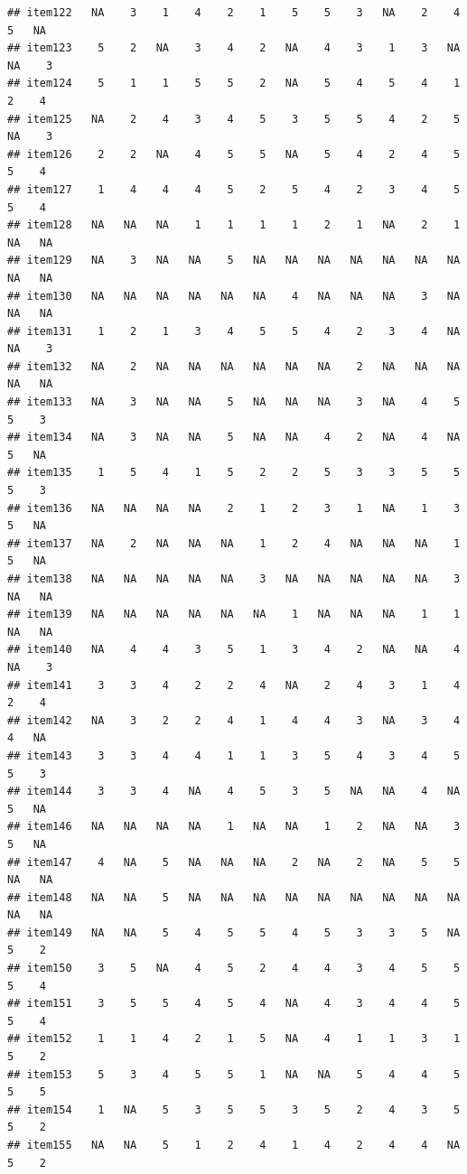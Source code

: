 \documentclass[
  man]{apa6}
\begin{document}
\begin{verbatim}
## item122   NA    3    1    4    2    1    5    5    3   NA    2    4    5   NA
## item123    5    2   NA    3    4    2   NA    4    3    1    3   NA   NA    3
## item124    5    1    1    5    5    2   NA    5    4    5    4    1    2    4
## item125   NA    2    4    3    4    5    3    5    5    4    2    5   NA    3
## item126    2    2   NA    4    5    5   NA    5    4    2    4    5    5    4
## item127    1    4    4    4    5    2    5    4    2    3    4    5    5    4
## item128   NA   NA   NA    1    1    1    1    2    1   NA    2    1   NA   NA
## item129   NA    3   NA   NA    5   NA   NA   NA   NA   NA   NA   NA   NA   NA
## item130   NA   NA   NA   NA   NA   NA    4   NA   NA   NA    3   NA   NA   NA
## item131    1    2    1    3    4    5    5    4    2    3    4   NA   NA    3
## item132   NA    2   NA   NA   NA   NA   NA   NA    2   NA   NA   NA   NA   NA
## item133   NA    3   NA   NA    5   NA   NA   NA    3   NA    4    5    5    3
## item134   NA    3   NA   NA    5   NA   NA    4    2   NA    4   NA    5   NA
## item135    1    5    4    1    5    2    2    5    3    3    5    5    5    3
## item136   NA   NA   NA   NA    2    1    2    3    1   NA    1    3    5   NA
## item137   NA    2   NA   NA   NA    1    2    4   NA   NA   NA    1    5   NA
## item138   NA   NA   NA   NA   NA    3   NA   NA   NA   NA   NA    3   NA   NA
## item139   NA   NA   NA   NA   NA   NA    1   NA   NA   NA    1    1   NA   NA
## item140   NA    4    4    3    5    1    3    4    2   NA   NA    4   NA    3
## item141    3    3    4    2    2    4   NA    2    4    3    1    4    2    4
## item142   NA    3    2    2    4    1    4    4    3   NA    3    4    4   NA
## item143    3    3    4    4    1    1    3    5    4    3    4    5    5    3
## item144    3    3    4   NA    4    5    3    5   NA   NA    4   NA    5   NA
## item146   NA   NA   NA   NA    1   NA   NA    1    2   NA   NA    3    5   NA
## item147    4   NA    5   NA   NA   NA    2   NA    2   NA    5    5   NA   NA
## item148   NA   NA    5   NA   NA   NA   NA   NA   NA   NA   NA   NA   NA   NA
## item149   NA   NA    5    4    5    5    4    5    3    3    5   NA    5    2
## item150    3    5   NA    4    5    2    4    4    3    4    5    5    5    4
## item151    3    5    5    4    5    4   NA    4    3    4    4    5    5    4
## item152    1    1    4    2    1    5   NA    4    1    1    3    1    5    2
## item153    5    3    4    5    5    1   NA   NA    5    4    4    5    5    5
## item154    1   NA    5    3    5    5    3    5    2    4    3    5    5    2
## item155   NA   NA    5    1    2    4    1    4    2    4    4   NA    5    2

\end{verbatim}
\end{document}
